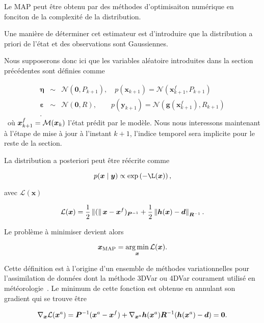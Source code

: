 Le MAP peut être obtenu par des méthodes d'optimisaiton numérique en fonciton de la complexité de la distribution.

Une manière de déterminer cet estimateur est d'introduire que la distribution a priori de l'état et des observations sont Gaussiennes.

Nous supposerons donc ici que les variables aléatoire introduites dans la section précédentes sont définies comme

\begin{eqnarray*}
    \bm \eta &\sim& \mathcal{N}(\bm 0, P_{k+1}), \quad p(\bm x_{k+1}) = \mathcal{N}(\bm x_{k+1}^f, P_{k+1})\\
    \bm \varepsilon & \sim & \mathcal N(\bm 0, R), \quad \quad p(\bm y_{k+1}) = \mathcal{N}(\bm g(\bm x_{k+1}^f) , R_{k+1})\\.
\end{eqnarray*}~où $\bm x_{k+1}^f = \mathcal{M}(\bm{x}_{k})$ l'état prédit par le modèle. Nous nous interessons maintenant à l'étape de mise à jour à l'instant $k+1$, l'indice temporel sera implicite pour le reste de la section.

La distribution a posteriori peut être réécrite comme

\begin{equation*}
    p(\bm x \mid \bm y) \propto \exp\left(- \mathcal{\L}(\bm x)\right),
\end{equation*}

avec $\mathcal L(\bm x)$

\begin{equation*}
    \mathcal L(\bm x) = \frac12 \left\lVert ( \right\rVert\bm x - \bm x^f)_{ \bm{P}^{-1}} + \frac12 \left\lVert \bm h(\bm x) - \bm d \right\rVert_{\bm{R}^{-1}}.
\end{equation*}

Le problème à minimiser devient alors

\begin{equation*}
    \bm x_{\text{MAP}} = \operatorname*{arg\,min}_{\bm x} \mathcal L(\bm x).
\end{equation*}

Cette définition est à l'origine d'un ensemble de méthodes variationnelles pour l'assimilation de données dont la méthode 3DVar ou 4DVar courament utilisé en météorologie~\cite{talagrand1997assimilation}.
Le minimum de cette fonction est obtenue en annulant son gradient qui se trouve être

\begin{equation*}
    \nabla_{\bm{x}} \mathcal L(\bm{x}^a) = \bm{P}^{-1} (\bm{x}^a - \bm{x}^f) + \nabla_{\bm{x}^a} \bm h (\bm{x}^a) \bm{R}^{-1}(\bm{h}(\bm{x}^a) - \bm d) = \bm 0.
\end{equation*}


